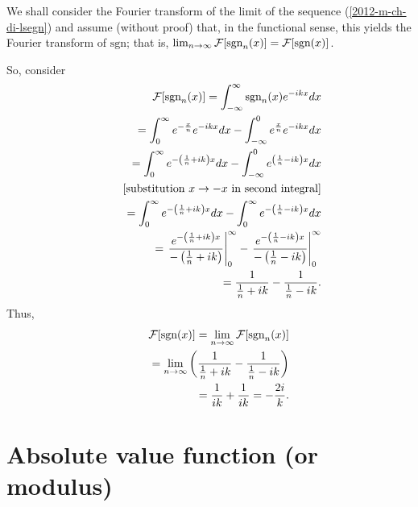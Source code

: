 We shall consider the Fourier transform of the limit of the sequence (\ref{2012-m-ch-di-lsegn})
and assume (without proof) that, in the functional sense,
this yields the   Fourier transform of $\textrm{sgn}$; that is,
$
\lim_{n\rightarrow \infty}
{\cal F}[ \textrm{sgn}_n(x) ]
=
{\cal F}[ \textrm{sgn}(x) ]
$.

So, consider
\begin{equation}
\begin{split}
  {\cal F}[\textrm{sgn}_n (x)]= \int_{-\infty}^\infty  \textrm{sgn}_n (x) e^{-i{kx}} dx   \\
\qquad =
\int_{0}^\infty  e^{-\frac{x}{n}} e^{-i{kx}} dx
-
\int_{-\infty}^0  e^{ \frac{x}{n}} e^{-i{kx}} dx
\\
\qquad =
\int_{0}^\infty  e^{-\left(\frac{1}{n}+i{k}\right) x} dx
-
\int_{-\infty}^0  e^{ \left(\frac{1}{n}-i{k}\right) x} dx
\\
\qquad \;
[\textrm{substitution }x \rightarrow -x \textrm{ in second integral}]\\
\qquad =
\int_{0}^\infty  e^{-\left(\frac{1}{n}+i{k}\right) x} dx
-
\int_{0}^\infty  e^{-\left(\frac{1}{n}-i{k}\right) x} dx
\\
\qquad =
\left.  \frac{ e^{-\left(\frac{1}{n}+i{k}\right) x}}{{-\left(\frac{1}{n}+i{k}\right)  }} \right|_{0}^\infty
-
\left.  \frac{ e^{-\left(\frac{1}{n}-i{k}\right) x}}{-\left(\frac{1}{n}-i{k}\right)} \right|_{0}^\infty
\\
\qquad =
  \frac{ 1}{  \frac{1}{n}+i{k} }
-
 \frac{ 1 }{ \frac{1}{n}-i{k} }
.
\end{split}
\label{2011-m-ftsgn1a}
\end{equation}
Thus,
\begin{equation}
\begin{split}
{\cal F}[\textrm{sgn}  (x)] =\lim_{n\rightarrow \infty}  {\cal F}[\textrm{sgn}_n (x)]
\\
\qquad =  \lim_{n\rightarrow \infty}  \left(
  \frac{ 1}{ \frac{1}{n}+i{k}   }
-
 \frac{ 1 }{  \frac{1}{n}-i{k}   }          \right)
\\
\qquad =
  \frac{ 1}{   i{k}  }
+
 \frac{ 1 }{  i{k} }
 =
  -\frac{2i}{ k }
.
\end{split}
\label{2011-m-ftsgn1b}
\end{equation}
\fi




\section{Absolute value function (or modulus)}

